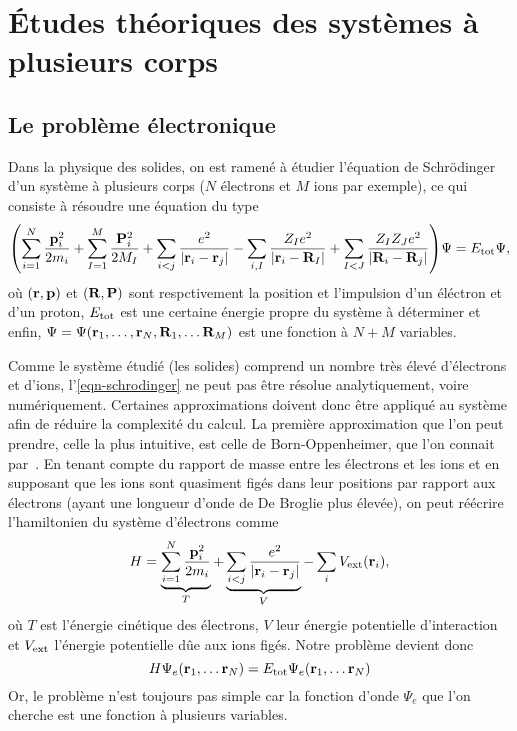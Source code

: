 \chapter{Études théoriques des systèmes à plusieurs corps}
\label{chap-theory}
\section{Le problème électronique}
Dans la physique des solides, on est ramené à étudier l'équation de Schrödinger d'un système
à plusieurs corps ($N$ électrons et $M$ ions par exemple),
ce qui consiste à résoudre une équation du type
\begin{equation}
  \label{eqn-schrodinger}
  \qty(\sum_{i=1}^N \frac{\vb{p}_i^2}{2m_i}
  + \sum_{I=1}^M \frac{\vb{P}_i^2}{2M_I}
  + \sum_{i<j}\frac{e^2}{\abs{\vb{r}_i - \vb{r}_j}}
  - \sum_{i,I}\frac{Z_I e^2}{\abs{\vb{r}_i - \vb{R}_I}}
  + \sum_{I<J}\frac{Z_I Z_J e^2}{\abs{\vb{R}_i - \vb{R}_j}} )\Psi = E_{\textnormal{tot}}\Psi,
\end{equation}
où $(\vb{r}, \vb{p})$ et $(\vb{R}, \vb{P})$ sont respctivement la position et l'impulsion d'un éléctron et d'un proton,
$E_{\textnormal{tot}}$ est une certaine énergie propre du système à déterminer et enfin,
$\Psi = \Psi(\vb{r}_1, \ldots, \vb{r}_N,  \vb{R}_1, \ldots \vb{R}_M)$ est une fonction à $N+M$ variables.

Comme le système étudié (les solides) comprend un nombre très élevé d'électrons et d'ions,
l'\cref{eqn-schrodinger} ne peut pas être résolue analytiquement, voire numériquement.
Certaines approximations doivent donc être appliqué au système afin de réduire la complexité du calcul.
La première approximation que l'on peut prendre, celle la plus intuitive,
est celle de Born-Oppenheimer, que l'on connait par~\cite{Born1927}.
En tenant compte du rapport de masse entre les électrons et les ions
et en supposant que les ions sont quasiment figés dans leur positions par rapport aux électrons
(ayant une longueur d'onde de De Broglie plus élevée),
on peut réécrire l'hamiltonien du système d'électrons comme
\begin{equation*}
  H = \underbrace{\sum_{i=1}^N\frac{\vb{p}_i^2}{2m_i}}_{T}
    + \underbrace{\sum_{i<j}\frac{e^2}{\abs{\vb{r}_i - \vb{r}_j}}}_{V}
    - \sum_i V_{\textnormal{ext}}(\vb{r}_i),
\end{equation*}
où $T$ est l'énergie cinétique des électrons, $V$ leur énergie potentielle d'interaction
et $V_{\textnormal{ext}}$ l'énergie potentielle dûe aux ions figés.
Notre problème devient donc
\begin{equation*}
  H\Psi_e(\vb{r}_1, \ldots \vb{r}_N) = E_{\textnormal{tot}} \Psi_e(\vb{r}_1, \ldots \vb{r}_N)
\end{equation*}
Or, le problème n'est toujours pas simple car la fonction d'onde $\Psi_e$
que l'on cherche est une fonction à plusieurs variables.

